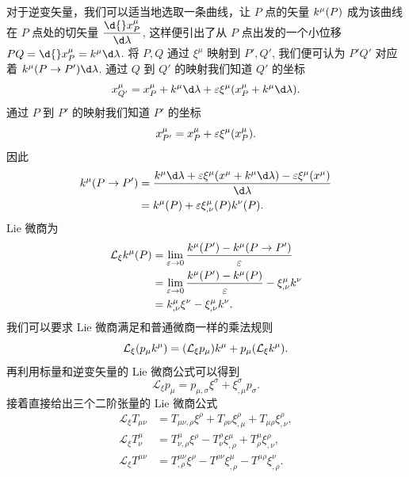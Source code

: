 \documentclass[UTF8, 12pt, a4paper, oneside, onecolumn, fontset=none]{ctexart}
\begin{document}
对于逆变矢量，我们可以适当地选取一条曲线，让 $P$ 点的矢量 $k^{\mu}\mleft(P\mright)$ 成为该曲线在 $P$ 点处的切矢量 $\dfrac{\d{}x^{\mu}_{P}}{\d\lambda}$, 这样便引出了从 $P$ 点出发的一个小位移 $PQ=\d{}x^{\mu}_{P}=k^{\mu}\d\lambda$. 将 $P, Q$ 通过 $\xi^{\mu}$ 映射到 $P', Q'$, 我们便可认为 $P'Q'$ 对应着 $k^{\mu}\mleft(P\to P'\mright)\d\lambda$. 通过 $Q$ 到 $Q'$ 的映射我们知道 $Q'$ 的坐标
\begin{equation}
x^{\mu}_{Q'}=x^{\mu}_{P}+k^{\mu}\d\lambda+\varepsilon\xi^{\mu}\mleft(x^{\mu}_{P}+k^{\mu}\d\lambda\mright).
\end{equation}
通过 $P$ 到 $P'$ 的映射我们知道 $P'$ 的坐标
\begin{equation}
x^{\mu}_{P'}=x^{\mu}_{P}+\varepsilon\xi^{\mu}\mleft(x^{\mu}_{P}\mright).
\end{equation}
因此
\begin{align}
k^{\mu}\mleft(P\to P'\mright)&=\frac{k^{\mu}\d\lambda+\varepsilon\xi^{\mu}\mleft(x^{\mu}+k^{\mu}\d\lambda\mright)-\varepsilon\xi^{\mu}\mleft(x^{\mu}\mright)}{\d\lambda}\notag\\
&=k^{\mu}\mleft(P\mright)+\varepsilon\xi^{\mu}_{,\nu}\mleft(P\mright) k^{\nu}\mleft(P\mright).\label{1.11.6}
\end{align}
Lie 微商为
\begin{align}
\mathcal{L}_{\xi}k^{\mu}\mleft(P\mright)&=\lim_{\varepsilon\to0}\frac{k^{\mu}\mleft(P'\mright)-k^{\mu}\mleft(P\to P'\mright)}{\varepsilon}\notag\\
&=\lim_{\varepsilon\to0}\frac{k^{\mu}\mleft(P'\mright)-k^{\mu}\mleft(P\mright)}{\varepsilon}-\xi^{\mu}_{,\nu}k^{\nu}\notag\\
&=k^{\mu}_{,\nu}\xi^{\nu}-\xi^{\mu}_{,\nu}k^{\nu}.
\end{align}
我们可以要求 Lie 微商满足和普通微商一样的乘法规则
\begin{equation}
\mathcal{L}_{\xi}\mleft(p_{\mu}k^{\mu}\mright)=\mleft(\mathcal{L}_{\xi}p_{\mu}\mright) k^{\mu}+p_{\mu}\mleft(\mathcal{L}_{\xi}k^{\mu}\mright).
\end{equation}
再利用标量和逆变矢量的 Lie 微商公式可以得到
\begin{equation}
\mathcal{L}_{\xi}p_{\mu}=p_{\mu,\sigma}\xi^{\sigma}+\xi^{\sigma}_{,\mu}p_{\sigma}.
\end{equation}
接着直接给出三个二阶张量的 Lie 微商公式
\begin{align}
\mathcal{L}_{\xi}T_{\mu\nu}&=T_{\mu\nu,\rho}\xi^{\rho}+T_{\rho\nu}\xi^{\rho}_{,\mu}+T_{\mu\rho}\xi^{\rho}_{,\nu},\\
\mathcal{L}_{\xi}T^{\mu}_{\nu}&=T^{\mu}_{\nu,\rho}\xi^{\rho}-T^{\rho}_{\nu}\xi^{\mu}_{,\rho}+T^{\mu}_{\rho}\xi^{\rho}_{,\nu},\\
\mathcal{L}_{\xi}T^{\mu\nu}&=T^{\mu\nu}_{,\rho}\xi^{\rho}-T^{\rho\nu}\xi^{\mu}_{,\rho}-T^{\mu\rho}\xi^{\nu}_{,\rho}.
\end{align}
\end{document}
